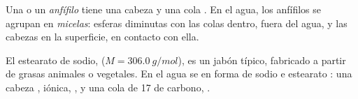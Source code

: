 \begin{definition}\label{def:g11:dissolution:amphiphilic}
Una  o un  \emph{anfífilo} tiene una cabeza
 y una cola . En el agua, los  anfífilos se
agrupan en \emph{micelas}: esferas diminutas con las
colas dentro, fuera del agua, y las cabezas en la superficie, en
contacto con ella.
\end{definition}

\begin{example}[Un jabón]\label{ex:g11:dissolution:soap}
El estearato de sodio,  ($M = \qty{306.0}{g/mol}$), es
un jabón típico, fabricado a partir de grasas animales o vegetales. En
el agua se  en forma de  sodio  e  estearato
: una cabeza , iónica, , y una cola de
17  de carbono, .
\end{example}

